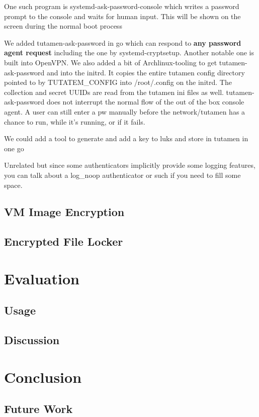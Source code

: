 \documentclass[letterpaper,twocolumn,10pt]{article}
\begin{document}
One such program is systemd-ask-password-console which writes a password prompt
to the console and waits for human input. This will be shown on the screen
during the normal boot process

We added tutamen-ask-password in go which can respond to \textbf{any password
agent request} including the one by systemd-cryptsetup. Another notable one is
built into OpenVPN. We also added a bit of Archlinux-tooling to get
tutamen-ask-password and into the initrd. It copies the entire tutamen config
directory pointed to by TUTATEM\_CONFIG into /root/.config on the initrd. The
collection and secret UUIDs are read from the tutamen ini files as well.
tutamen-ask-password does not interrupt the normal flow of the out of the box
console agent. A user can still enter a pw manually before the network/tutamen
has a chance to run, while it's running, or if it fails.

We could add a tool to generate and add a key to luks and store in tutamen in
one go

Unrelated but since some authenticators implicitly provide some logging
features, you can talk about a log\_noop authenticator or such if you need to
fill some space.


\subsection{VM Image Encryption}

\subsection{Encrypted File Locker}

\section{Evaluation}
\label{sec:eval}

\subsection{Usage}

\subsection{Discussion}

\section{Conclusion}
\label{sec:conclusion}

\subsection{Future Work}


{
  \footnotesize
  
  
}
\end{document}
